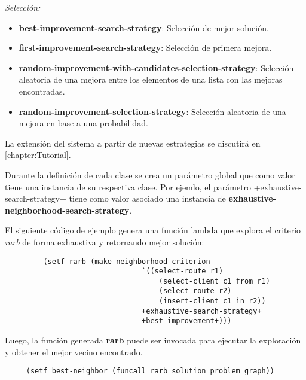 \textit{Selección:}
\begin{itemize}
	\item \textbf{best-improvement-search-strategy}: Selección de mejor solución.
	\item \textbf{first-improvement-search-strategy}: Selección de primera mejora.
	\item \textbf{random-improvement-with-candidates-selection-strategy}: Selección aleatoria de una mejora entre los elementos de una lista con las mejoras encontradas.
	\item \textbf{random-improvement-selection-strategy}: Selección aleatoria de una mejora en base a una probabilidad.
\end{itemize}

La extensión del sistema a partir de nuevas estrategias se discutirá en \ref{chapter:Tutorial}.

Durante la definición de cada clase se crea un parámetro global que como valor tiene una instancia de su respectiva clase. Por ejemlo, el parámetro +exhaustive-search-strategy+ tiene como valor asociado una instancia de \textbf{exhaustive-neighborhood-search-strategy}.

El siguiente código de ejemplo genera una función lambda que explora el criterio \textit{rarb} de forma exhaustiva y retornando mejor solución:


\begin{lstlisting}
		 (setf rarb (make-neighborhood-criterion 
								`((select-route r1)
									(select-client c1 from r1)
									(select-route r2)
									(insert-client c1 in r2))
								+exhaustive-search-strategy+ 
								+best-improvement+)))
\end{lstlisting}

Luego, la función generada \textbf{rarb} puede ser invocada para ejecutar la exploración y obtener el mejor vecino encontrado.

\begin{lstlisting}
	 (setf best-neighbor (funcall rarb solution	problem	graph))
\end{lstlisting}	












